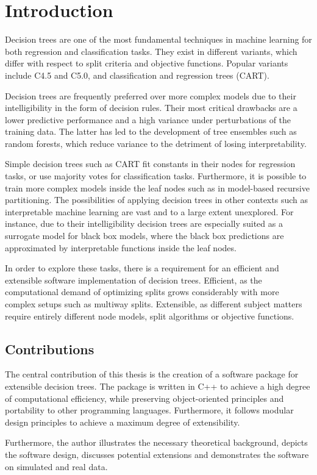 \documentclass[a4paper, 11pt]{article}
\begin{document}
\section{Introduction}

Decision trees are one of the most fundamental techniques in machine learning for both regression and classification tasks. They exist in different variants, which differ with respect to split criteria and objective functions. Popular variants include C4.5 and C5.0, and classification and regression trees (CART).
\par
Decision trees are frequently preferred over more complex models due to their intelligibility in the form of decision rules. Their most critical drawbacks are a lower predictive performance and a high variance under perturbations of the training data. The latter has led to the development of tree ensembles such as random forests, which reduce variance to the detriment of losing interpretability.
\par
Simple decision trees such as CART fit constants in their nodes for regression tasks, or use majority votes for classification tasks. Furthermore, it is possible to train more complex models inside the leaf nodes such as in model-based recursive partitioning. The possibilities of applying decision trees in other contexts such as interpretable machine learning are vast and to a large extent unexplored. For instance, due to their intelligibility decision trees are especially suited as a surrogate model for black box models, where the black box predictions are approximated by interpretable functions inside the leaf nodes.
\par
In order to explore these tasks, there is a requirement for an efficient and extensible software implementation of decision trees. Efficient, as the computational demand of optimizing splits grows considerably with more complex setups such as multiway splits. Extensible, as different subject matters require entirely different node models, split algorithms or objective functions.
\par

\subsection{Contributions} The central contribution of this thesis is the creation of a software package for extensible decision trees. The package is written in C++ to achieve a high degree of computational efficiency, while preserving object-oriented principles and portability to other programming languages. Furthermore, it follows modular design principles to achieve a maximum degree of extensibility.
\par
Furthermore, the author illustrates the necessary theoretical background, depicts the software design, discusses potential extensions and demonstrates the software on simulated and real data.
\end{document}
